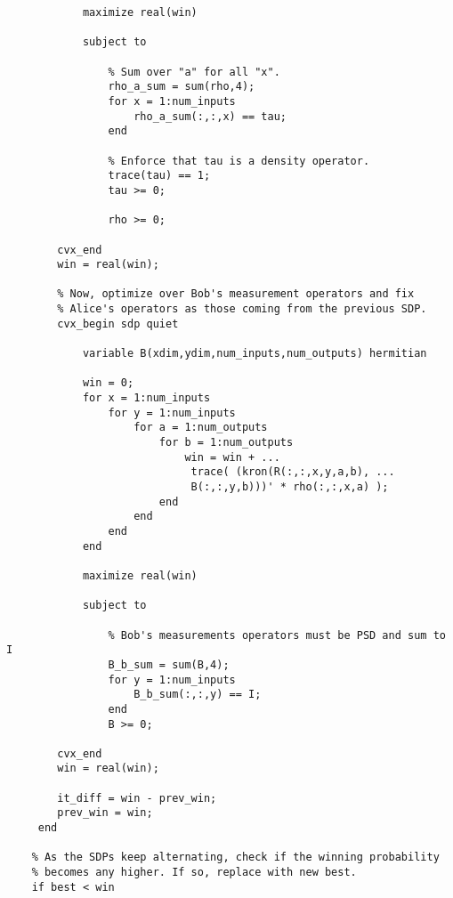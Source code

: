 \begin{verbatim}
            maximize real(win)

            subject to 
                
                % Sum over "a" for all "x". 
                rho_a_sum = sum(rho,4);
                for x = 1:num_inputs
                    rho_a_sum(:,:,x) == tau;
                end
                                                                           
                % Enforce that tau is a density operator.
                trace(tau) == 1;
                tau >= 0;
                                   
                rho >= 0; 

        cvx_end            
        win = real(win);
                   
        % Now, optimize over Bob's measurement operators and fix 
        % Alice's operators as those coming from the previous SDP.
        cvx_begin sdp quiet
                        
            variable B(xdim,ydim,num_inputs,num_outputs) hermitian 
                                                         
            win = 0;
            for x = 1:num_inputs
                for y = 1:num_inputs
                    for a = 1:num_outputs
                        for b = 1:num_outputs                                                               
                            win = win + ...
                             trace( (kron(R(:,:,x,y,a,b), ...
                             B(:,:,y,b)))' * rho(:,:,x,a) );
                        end
                    end
                end
            end     
            
            maximize real(win)
            
            subject to 
                          
                % Bob's measurements operators must be PSD and sum to I
                B_b_sum = sum(B,4);
                for y = 1:num_inputs
                    B_b_sum(:,:,y) == I;
                end
                B >= 0;                                                           
                             
        cvx_end           
        win = real(win);
        
        it_diff = win - prev_win;
        prev_win = win;
     end
    
    % As the SDPs keep alternating, check if the winning probability
    % becomes any higher. If so, replace with new best.
    if best < win
        

\end{verbatim}
